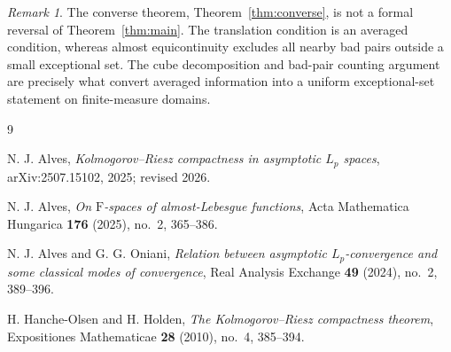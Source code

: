 \documentclass[11pt]{article}
\theoremstyle{plain}
\theoremstyle{definition}
\theoremstyle{remark}
\newtheorem{remark}{Remark}
\begin{document}
\begin{remark}
The converse theorem, Theorem~\ref{thm:converse}, is not a formal reversal of
Theorem~\ref{thm:main}. The translation condition is an averaged condition,
whereas almost equicontinuity excludes all nearby bad pairs outside a small
exceptional set. The cube decomposition and bad-pair counting argument are
precisely what convert averaged information into a uniform exceptional-set
statement on finite-measure domains.
\end{remark}

\begin{thebibliography}{9}

N. J. Alves,
\emph{Kolmogorov--Riesz compactness in asymptotic $L_p$ spaces},
arXiv:2507.15102, 2025; revised 2026.

N. J. Alves,
\emph{On $\mathrm{F}$-spaces of almost-Lebesgue functions},
Acta Mathematica Hungarica \textbf{176} (2025), no.~2, 365--386.

N. J. Alves and G. G. Oniani,
\emph{Relation between asymptotic $L_p$-convergence and some classical modes
of convergence},
Real Analysis Exchange \textbf{49} (2024), no.~2, 389--396.

H. Hanche-Olsen and H. Holden,
\emph{The Kolmogorov--Riesz compactness theorem},
Expositiones Mathematicae \textbf{28} (2010), no.~4, 385--394.

\end{thebibliography}
\end{document}
